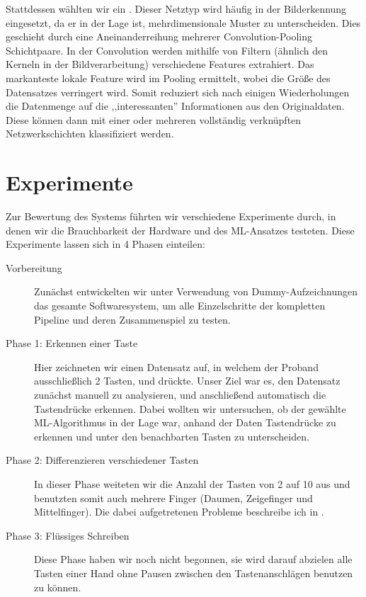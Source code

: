 Stattdessen wählten wir ein 
\citep[CNN;][]{cnn_orig}. Dieser Netztyp wird häufig in der Bilderkennung
eingesetzt, da er in der Lage ist, mehrdimensionale Muster zu unterscheiden.
Dies geschieht durch eine Aneinanderreihung mehrerer Convolution-Pooling
Schichtpaare. In der Convolution werden mithilfe von Filtern (ähnlich den
Kerneln in der Bildverarbeitung) verschiedene Features extrahiert. Das
markanteste lokale Feature wird im Pooling ermittelt, wobei die Größe des
Datensatzes verringert wird. Somit reduziert sich nach einigen Wiederholungen
die Datenmenge auf die ,,interessanten'' Informationen aus den Originaldaten.
Diese können dann mit einer oder mehreren vollständig verknüpften
Netzwerkschichten klassifiziert werden.

\section{Experimente}

Zur Bewertung des Systems führten wir verschiedene Experimente durch, in denen
wir die Brauchbarkeit der Hardware und des ML-Ansatzes testeten. Diese
Experimente lassen sich in 4 Phasen einteilen:

\begin{description}
    \item[Vorbereitung]
        Zunächst entwickelten wir unter Verwendung von Dummy-Aufzeichnungen das
        gesamte Softwaresystem, um alle Einzelschritte der kompletten Pipeline
        und deren Zusammenspiel zu testen.

    \item[Phase 1: Erkennen einer Taste]
        Hier zeichneten wir einen Datensatz auf, in welchem der Proband
        ausschließlich 2 Tasten,  und  drückte. Unser
        Ziel war es, den Datensatz zunächst manuell zu analysieren, und
        anschließend automatisch die Tastendrücke erkennen. Dabei wollten wir
        untersuchen, ob der gewählte ML-Algorithmus in der Lage war, anhand der
        Daten Tastendrücke zu erkennen und unter den benachbarten Tasten zu
        unterscheiden.

    \item[Phase 2: Differenzieren verschiedener Tasten]
        In dieser Phase weiteten wir die Anzahl der Tasten von 2 auf 10 aus und
        benutzten somit auch mehrere Finger (Daumen, Zeigefinger und
        Mittelfinger). Die dabei aufgetretenen Probleme beschreibe ich in
        .

    \item[Phase 3: Flüssiges Schreiben]
        Diese Phase haben wir noch nicht begonnen, sie wird darauf abzielen
        alle Tasten einer Hand ohne Pausen zwischen den Tastenanschlägen
        benutzen zu können.
\end{description}

